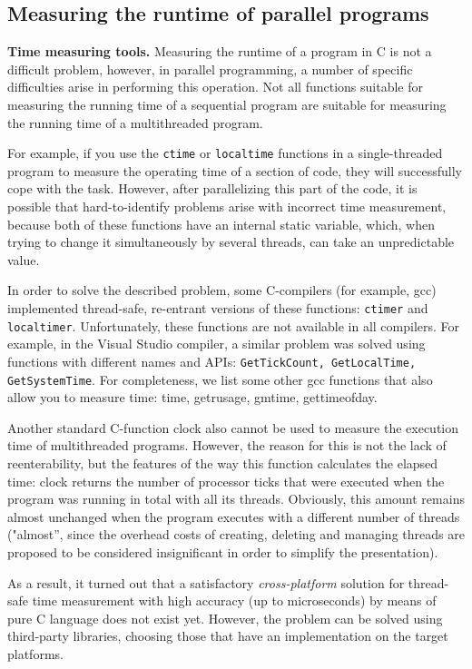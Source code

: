 { %
	\subsection{Measuring the runtime of parallel programs}
	\par\textbf{Time measuring tools.} Measuring the runtime of a program in C is not a difficult problem, however, in parallel programming, a number of specific difficulties arise in performing this operation. Not all functions suitable for measuring the running time of a sequential program are suitable for measuring the running time of a multithreaded program.
	\par For example, if you use the \texttt{ctime} or \texttt{localtime} functions in a single-threaded program to measure the operating time of a section of code, they will successfully cope with the task. However, after parallelizing this part of the code, it is possible that hard-to-identify problems arise with incorrect time measurement, because both of these functions have an internal static variable, which, when trying to change it simultaneously by several threads, can take an unpredictable value.
	\par In order to solve the described problem, some C-compilers (for example, gcc) implemented thread-safe, re-entrant versions of these functions: \texttt{ctime\textunderscore r} and \texttt{localtime\textunderscore r}. Unfortunately, these functions are not available in all compilers. For example, in the Visual Studio compiler, a similar problem was solved using functions with different names and APIs: \texttt{GetTickCount, GetLocalTime, GetSystemTime}. For completeness, we list some other gcc functions that also allow you to measure time: time, getrusage, gmtime, gettimeofday.
	\par Another standard C-function clock also cannot be used to measure the execution time of multithreaded programs. However, the reason for this is not the lack of reenterability, but the features of the way this function calculates the elapsed time: clock returns the number of processor ticks that were executed when the program was running in total with all its threads. Obviously, this amount remains almost unchanged when the program executes with a different number of threads ("almost'', since the overhead costs of creating, deleting and managing threads are proposed to be considered insignificant in order to simplify the presentation).
	\par As a result, it turned out that a satisfactory \textit{cross-platform} solution for thread-safe time measurement with high accuracy (up to microseconds) by means of pure C language does not exist yet. However, the problem can be solved using third-party libraries, choosing those that have an implementation on the target platforms.
}
